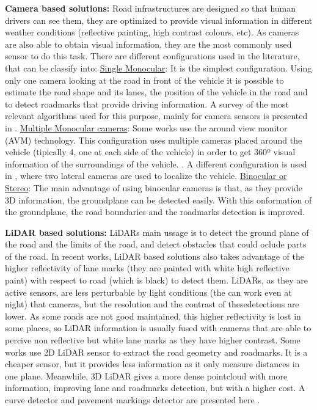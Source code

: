 \textbf{Camera based solutions:}
Road infrastructures are designed so that human drivers can see them, they are optimized to provide visual information in different weather conditions (reflective painting, high contrast colours, etc). As cameras are also able to obtain visual information, they are the most commonly used sensor to do this task. There are different configurations used in the literature, that can be classify into:
\underline{Single Monocular}: It is the simplest configuration. Using only one camera looking at the road in front of the vehicle it is possible to estimate the road shape and its lanes, the position of the vehicle in the road and to detect roadmarks  that provide driving information. A survey of the most relevant algorithms used for this purpose, mainly for camera sensors is presented in \cite{hillel2014recent}.
\underline{Multiple Monocular cameras}: Some works use the around view monitor (AVM) technology. This configuration uses multiple cameras placed around the vehicle (tipically 4, one at each side of the vehicle) in order to get 360º visual information of the surroundings of the vehicle. \cite{lee2017avm, kum2013lane}. A different configuration is used in \cite{Ieng2003}, where two lateral cameras are used to localize the vehicle. 
\underline{Binocular or Stereo}: The main advantage of using binocular cameras is that, as they provide 3D information, the groundplane can be detected easily. With this onformation of the groundplane, the road boundaries and the roadmarks detection is improved. \cite{schreiber2013laneloc, ozgunalp2017multiple}

\textbf{LiDAR based solutions:}
LiDARs main ussage is to detect the ground plane of the road and the limits of the road, and detect obstacles that could oclude parts of the road.
In recent works, LiDAR based solutions also takes advantage of the higher reflectivity of lane marks (they are painted with  white  high reflective paint) with respect to road (which is black) to detect them. LiDARs, as they are active sensors, are less perturbable by light conditions (the can work even at night) that cameras, but the resolution and the contrast of thesedetections are lower.
As some roads are not good maintained, this higher reflectivity is lost in some places, so LiDAR information is usually fused with cameras that are able to percive non reflective but white lane marks as they have higher contrast.
Some works use 2D LiDAR sensor to extract the road geometry and roadmarks. It is a cheaper sensor, but it provides less information as it only measure distances in one plane. \cite{nie2012camera, kim2015lane, lee2017avm}
Meanwhile, 3D LiDAR gives a more dense pointcloud with more information, improving lane and roadmarks detection, but with a higher cost. A curve detector and pavement markings detector are presented here \cite{yang2012automated, zhao2012curb, li2013new, Zhang2016}.


